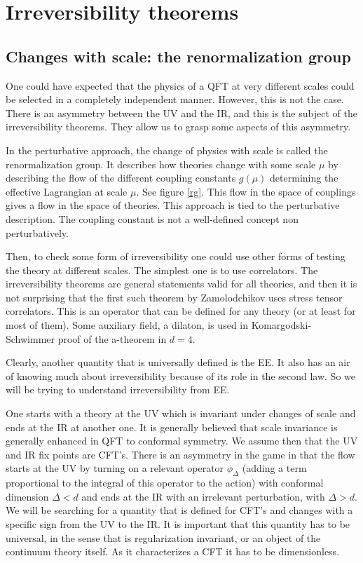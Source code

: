 \documentclass[11pt]{article}
\numberwithin{equation}{section}
\begin{document}
\newpage
 
\section{Irreversibility theorems}

\subsection{Changes with scale: the renormalization group}
One could have expected that the physics of a QFT at very different scales could be selected in a completely independent manner. However, this is not the case. There is an asymmetry between the UV and the IR, and this is the subject of the irreversibility theorems. They allow us to grasp some aspects of this asymmetry. 

In the perturbative approach, the change of physics with scale is called the renormalization group. It describes how theories change with some scale $\mu$ by describing the flow of the different coupling constants $g(\mu)$ determining the effective Lagrangian at scale $\mu$. See figure \ref{rg}. This flow in the space of couplings gives a flow in the space of theories. 
 This approach is tied to the perturbative description. The coupling constant is not a well-defined concept non perturbatively. 

Then, to check some form of irreversibility one could use other forms of testing the theory at different scales. The simplest one is to use correlators. The irreversibility theorems are general statements valid for all theories, and then it is not surprising that the first such theorem by Zamolodchikov uses stress tensor correlators.  This is an operator that can be defined for any theory (or at least for most of them). Some auxiliary field, a dilaton, is used in Komargodski-Schwimmer proof of the a-theorem in $d=4$.

Clearly, another quantity that is universally defined is the EE. It also has an air of knowing much about irreversibility because of its role in the second law. So we will be trying to understand irreversibility from EE.
  
One starts with a theory at the UV which is invariant under changes of scale and ends at the IR at another one. It is generally believed that scale invariance is generally enhanced in QFT to conformal symmetry. We assume then that the UV and IR fix points are CFT's. There is an asymmetry in the game in that the flow starts at the UV by turning on a relevant operator $\phi_\Delta$ (adding a term proportional to the integral of this operator to the action) with conformal dimension $\Delta< d$ and ends at the IR with an irrelevant perturbation, with $\Delta>d$. 
We will be searching for a quantity that is defined for CFT's and changes with a specific sign from the UV to the IR. It is important that this quantity has to be universal, in the sense that is regularization invariant, or an object of the continuum theory itself. As it characterizes a CFT it has to be dimensionless.   
\end{document}

